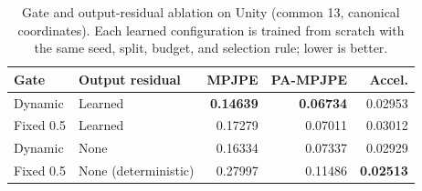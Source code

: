 \begin{table}[htbp]
\centering
\caption{Gate and output-residual ablation on Unity (common 13, canonical coordinates). Each learned configuration is trained from scratch with the same seed, split, budget, and selection rule; lower is better.}
\label{tab:gate_retraining}
\small
\setlength{\tabcolsep}{5pt}
\begin{tabular}{llrrr}
\toprule
Gate & Output residual & MPJPE & PA-MPJPE & Accel. \\
\midrule
Dynamic & Learned & \textbf{0.14639} & \textbf{0.06734} & 0.02953 \\
Fixed 0.5 & Learned & 0.17279 & 0.07011 & 0.03012 \\
Dynamic & None & 0.16334 & 0.07337 & 0.02929 \\
Fixed 0.5 & None (deterministic) & 0.27997 & 0.11486 & \textbf{0.02513} \\
\bottomrule
\end{tabular}
\end{table}
